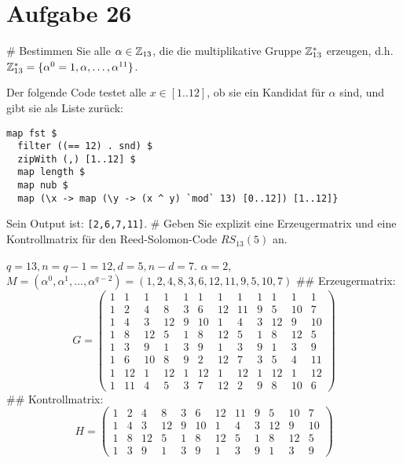 \section*{Aufgabe 26}
\begin{myList}
#
Bestimmen Sie alle $\alpha \in \mathbb{Z}_{13}$, die die multiplikative Gruppe $\mathbb{Z}_{13}^*$ erzeugen, d.h. $\mathbb{Z}_{13}^* = \lbrace \alpha^0 = 1,\alpha,\ldots,\alpha^{11} \rbrace$.\medskip

Der folgende Code testet alle $x\in[1..12]$, ob sie ein Kandidat für $\alpha$ sind, und gibt sie als Liste zurück:\\
\begin{lstlisting}
map fst $ 
  filter ((== 12) . snd) $ 
  zipWith (,) [1..12] $ 
  map length $
  map nub $ 
  map (\x -> map (\y -> (x ^ y) `mod` 13) [0..12]) [1..12]}
\end{lstlisting}
Sein Output ist: \lstinline{[2,6,7,11]}.
#
Geben Sie explizit eine Erzeugermatrix und eine Kontrollmatrix für den Reed-Solomon-Code $RS_{13}(5)$ an.\medskip

$q = 13, n = q - 1 = 12, d = 5, n - d = 7$. $\alpha=2$, $M = (\alpha^0, \alpha^1, \ldots, \alpha^{q-2})=(1, 2, 4, 8, 3, 6, 12, 11, 9, 5, 10, 7)$
## Erzeugermatrix:
$$G = \begin{pmatrix}
1 & 1 & 1 & 1 & 1 & 1 & 1 & 1 & 1 & 1 & 1 & 1\\
1 & 2 & 4 & 8 & 3 & 6 & 12 & 11 & 9 & 5 & 10 & 7\\
1 & 4 & 3 & 12 & 9 & 10 & 1 & 4 & 3 & 12 & 9 & 10\\
1 & 8 & 12 & 5 & 1 & 8 & 12 & 5 & 1 & 8 & 12 & 5\\
1 & 3 & 9 & 1 & 3 & 9 & 1 & 3 & 9 & 1 & 3 & 9\\
1 & 6 & 10 & 8 & 9 & 2 & 12 & 7 & 3 & 5 & 4 & 11\\
1 & 12 & 1 & 12 & 1 & 12 & 1 & 12 & 1 & 12 & 1 & 12\\
1 & 11 & 4 & 5 & 3 & 7 & 12 & 2 & 9 & 8 & 10 & 6
\end{pmatrix}$$
## Kontrollmatrix:
$$H = \begin{pmatrix}
1 & 2 & 4 & 8 & 3 & 6 & 12 & 11 & 9 & 5 & 10 & 7\\
1 & 4 & 3 & 12 & 9 & 10 & 1 & 4 & 3 & 12 & 9 & 10\\
1 & 8 & 12 & 5 & 1 & 8 & 12 & 5 & 1 & 8 & 12 & 5\\
1 & 3 & 9 & 1 & 3 & 9 & 1 & 3 & 9 & 1 & 3 & 9%
\end{pmatrix}$$
\end{myList}

